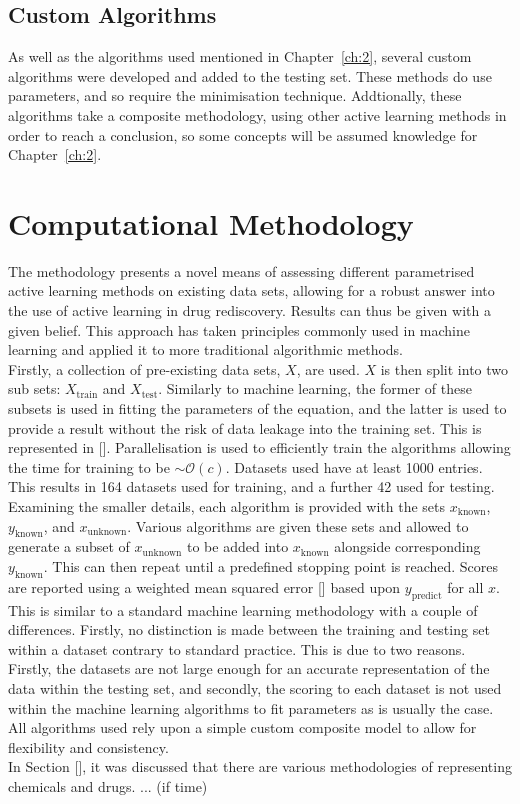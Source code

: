 \subsection{Custom Algorithms}
As well as the algorithms used mentioned in Chapter~\ref{ch:2}, several custom algorithms were developed and added to the testing set. These methods do use parameters, and so require the minimisation technique. Addtionally, these algorithms take a composite methodology, using other active learning methods in order to reach a conclusion, so some concepts will be assumed knowledge for Chapter~\ref{ch:2}.

\section{Computational Methodology}
The methodology presents a novel means of assessing different parametrised active learning methods on existing data sets, allowing for a robust answer into the use of active learning in drug rediscovery. Results can thus be given with a given belief. This approach has taken principles commonly used in machine learning and applied it to more traditional algorithmic methods.
\\
Firstly, a collection of pre-existing data sets, $X$, are used. $X$ is then split into two sub sets: $X_{\mathrm{train}}$ and $X_\mathrm{test}$. Similarly to machine learning, the former of these subsets is used in fitting the parameters of the equation, and the latter is used to provide a result without the risk of data leakage into the training set. This is represented in []. Parallelisation is used to efficiently train the algorithms allowing the time for training to be $\sim{}\mathcal{O}(c)$. Datasets used have at least 1000 entries. This results in 164 datasets used for training, and a further 42 used for testing.
\\
Examining the smaller details, each algorithm is provided with the sets $x_\mathrm{known}$, $y_\mathrm{known}$, and $x_\mathrm{unknown}$. Various algorithms are given these sets and allowed to generate a subset of $x_\mathrm{unknown}$ to be added into $x_\mathrm{known}$ alongside corresponding $y_\mathrm{known}$. This can then repeat until a predefined stopping point is reached. Scores are reported using a weighted mean squared error [] based upon $y_\mathrm{predict}$ for all $x$. This is similar to a standard machine learning methodology with a couple of differences. Firstly, no distinction is made between the training and testing set within a dataset contrary to standard practice. This is due to two reasons. Firstly, the datasets are not large enough for an accurate representation of the data within the testing set, and secondly, the scoring to each dataset is not used within the machine learning algorithms to fit parameters as is usually the case. All algorithms used rely upon a simple custom composite model to allow for flexibility and consistency.
\\
In Section [], it was discussed that there are various methodologies of representing chemicals and drugs. ... (if time)

